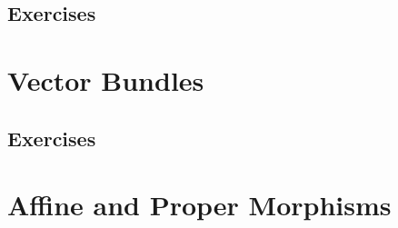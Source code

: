 \subsection{}
\subsection{}
\subsection{}
\subsection{Exercises}

\section{Vector Bundles}

\subsection{}
\subsection{}
\subsection{}
\subsection{}
\subsection{Exercises}

\section{Affine and Proper Morphisms}
\subsection{}
\subsection{}
\subsection{}
